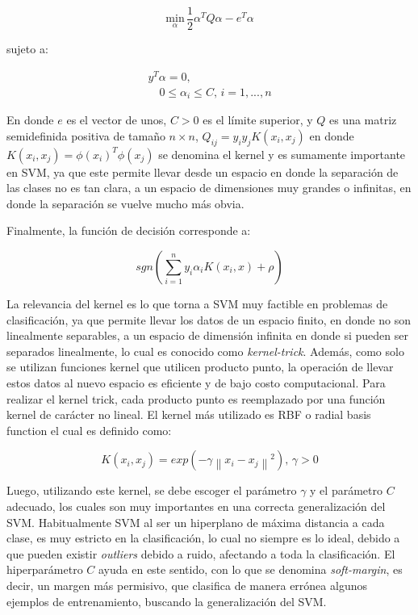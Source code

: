 \begin{equation} \underset{\alpha}{\mathrm{min}} \, \frac{1}{2} \alpha^{T} Q \alpha - e^{T} \alpha 
\end{equation}

sujeto a: 

\begin{align}
y^{T} \alpha = 0, \\
\quad 0\leq \alpha_{i} \leq C, \, i = 1, ..., n 
\end{align} 

En donde $e$ es el vector de unos, $ C > 0$ es el límite superior, y $ Q$ es una matriz semidefinida positiva de tamaño $ n \times n$, $ Q_{ij} = y_{i} y_{j} K(x_{i}, x_{j})$ en donde $K(x_{i}, x_{j}) = \phi(x_{i})^{T} \phi(x_{j})$ se denomina el kernel y es sumamente importante en SVM, ya que este permite llevar desde un espacio en donde la separación de las clases no es tan clara, a un espacio de dimensiones muy grandes o infinitas, en donde la separación se vuelve mucho más obvia.

Finalmente, la función de decisión corresponde a:

\begin{equation} sgn(\sum_{i=1}^{n}y_{i} \alpha_{i}K(x_{i}, x) + \rho) 
\end{equation} 

La relevancia del kernel es lo que torna a SVM muy factible en problemas de clasificación, ya que permite llevar los datos de un espacio finito, en donde no son linealmente separables, a un espacio de dimensión infinita en donde si pueden ser separados linealmente, lo cual es conocido como \textit{kernel-trick}. Además, como solo se utilizan funciones kernel que utilicen producto punto, la operación de llevar estos datos al nuevo espacio es eficiente y de bajo costo computacional. Para realizar el kernel trick, cada producto punto es reemplazado por una función kernel de carácter no lineal. El kernel más utilizado es RBF o radial basis function el cual es definido como:

\begin{equation} K(x_{i}, x_{j}) = exp(- \gamma \left\|{ x_{i} - x_{j}}\right\|^2) , \, \gamma > 0 
\end{equation}

Luego, utilizando este kernel, se debe escoger el parámetro $\gamma$ y el parámetro $ C$ adecuado, los cuales son muy importantes en una correcta generalización del SVM. Habitualmente SVM al ser un hiperplano de máxima distancia a cada clase, es muy estricto en la clasificación, lo cual no siempre es lo ideal, debido a que pueden existir \textit{outliers} debido a ruido, afectando a toda la clasificación. El hiperparámetro $C$ ayuda en este sentido, con lo que se denomina \textit{soft-margin}, es decir, un margen más permisivo, que clasifica de manera errónea algunos ejemplos de entrenamiento, buscando la generalización del SVM.


